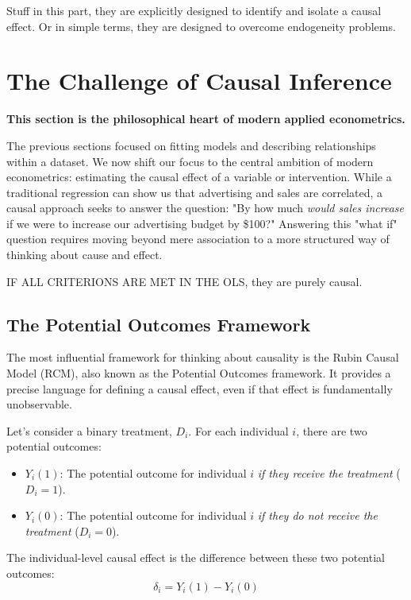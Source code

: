 \documentclass{article}
\providecommand{\tightlist}{
  \setlength{\itemsep}{0pt}
  \setlength{\parskip}{0pt}}
\begin{document}
Stuff in this part, they are explicitly designed to identify and isolate a causal effect. Or in simple terms, they are designed to overcome endogeneity problems.


\section{The Challenge of Causal Inference}
\label{sec:causal_inference_challenge}

\textbf{This section is the philosophical heart of modern applied econometrics.}

The previous sections focused on fitting models and describing relationships within a dataset. We now shift our focus to the central ambition of modern econometrics: estimating the causal effect of a variable or intervention. While a traditional regression can show us that advertising and sales are correlated, a causal approach seeks to answer the question: "By how much \textit{would sales increase} if we were to increase our advertising budget by \$100?" Answering this "what if" question requires moving beyond mere association to a more structured way of thinking about cause and effect.

IF ALL CRITERIONS ARE MET IN THE OLS, they are purely causal.


\subsection{The Potential Outcomes Framework}
\label{sub:potential_outcomes}

The most influential framework for thinking about causality is the Rubin Causal Model (RCM), also known as the Potential Outcomes framework. It provides a precise language for defining a causal effect, even if that effect is fundamentally unobservable.

Let's consider a binary treatment, $D_i$. For each individual $i$, there are two potential outcomes:
\begin{itemize}
    \tightlist
    \item $Y_i(1)$: The potential outcome for individual $i$ \textit{if they receive the treatment} ($D_i=1$).
    \item $Y_i(0)$: The potential outcome for individual $i$ \textit{if they do not receive the treatment} ($D_i=0$).
\end{itemize}
The individual-level causal effect is the difference between these two potential outcomes:
\begin{equation}
    \delta_i = Y_i(1) - Y_i(0)
\end{equation}
\end{document}
